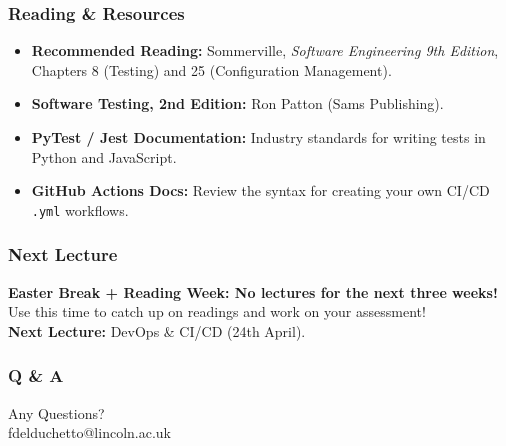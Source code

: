 \documentclass[xcolor=table]{beamer}
\begin{document}
\begin{frame}
    \frametitle{Reading \& Resources}
    \begin{itemize}
        \item \textbf{Recommended Reading:} 
        Sommerville, \textit{Software Engineering 9th Edition}, Chapters 8 (Testing) and 25 (Configuration Management).
        \item \textbf{Software Testing, 2nd Edition:} Ron Patton (Sams Publishing).
        \item \textbf{PyTest / Jest Documentation:} Industry standards for writing tests in Python and JavaScript.
        \item \textbf{GitHub Actions Docs:} Review the syntax for creating your own CI/CD \texttt{.yml} workflows.
    \end{itemize}
\end{frame}

\begin{frame}
    \frametitle{Next Lecture}

    \begin{center}
        \normalsize \textbf{Easter Break + Reading Week: No lectures for the next three weeks!}\\\vspace{0.5cm}
        \normalsize Use this time to catch up on readings and work on your assessment!\\\vspace{0.5cm}
        \textbf{Next Lecture:} DevOps \& CI/CD (24th April).
    \end{center}
\end{frame}

\begin{frame}
    \frametitle{Q \& A}
    \begin{center}
        \Huge Any Questions?\\\vspace{0.5cm} 
        \normalsize fdelduchetto@lincoln.ac.uk
    \end{center}
\end{frame}
\end{document}
